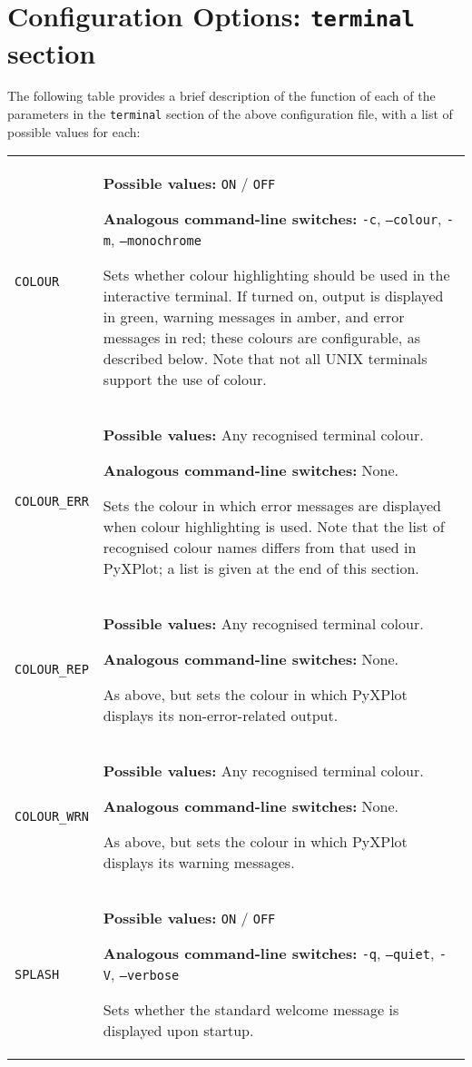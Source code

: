 \section{Configuration Options: {\tt terminal} section}
\label{sec:configfile_terminal}

The following table provides a brief description of the function of each of the
parameters in the {\tt terminal} section of the above configuration file,
with a list of possible values for each:

\begin{longtable}{p{3.4cm}p{9cm}}
{\tt COLOUR} & {\bf Possible values:} {\tt ON} / {\tt OFF}

               {\bf Analogous command-line switches:} {\tt -c}, {\tt --colour}, {\tt -m}, {\tt --monochrome}

               Sets whether colour highlighting should be used in the interactive terminal. If turned on, output is displayed in green, warning messages in amber, and error messages in red; these colours are configurable, as described below. Note that not all UNIX terminals support the use of colour.
               \\
{\tt COLOUR\_ERR} & {\bf Possible values:} Any recognised terminal colour.

               {\bf Analogous command-line switches:} None.

               Sets the colour in which error messages are displayed when colour highlighting is used. Note that the list of recognised colour names differs from that used in PyXPlot; a list is given at the end of this section.
               \\
{\tt COLOUR\_REP} & {\bf Possible values:} Any recognised terminal colour.

               {\bf Analogous command-line switches:} None.

               As above, but sets the colour in which PyXPlot displays its non-error-related output.
               \\
{\tt COLOUR\_WRN} & {\bf Possible values:} Any recognised terminal colour.

               {\bf Analogous command-line switches:} None.

               As above, but sets the colour in which PyXPlot displays its warning messages.
               \\
{\tt SPLASH} & {\bf Possible values:} {\tt ON} / {\tt OFF}

               {\bf Analogous command-line switches:} {\tt -q}, {\tt --quiet}, {\tt -V}, {\tt --verbose}

               Sets whether the standard welcome message is displayed upon startup.
               \\
\end{longtable}


